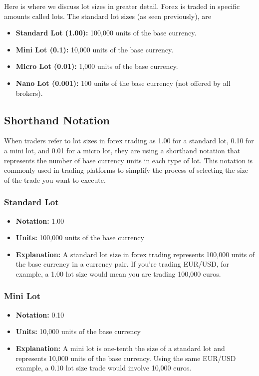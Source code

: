 \documentclass{report}
\begin{document}
     \pagebreak 
     \bigbreak \noindent 
     Here is where we discuss lot sizes in greater detail.
     \bigbreak \noindent 
     Forex is traded in specific amounts called lots. The standard lot sizes (as seen previously), are
     \begin{itemize}
         \item \textbf{Standard Lot (1.00):} 100,000 units of the base currency.
         \item \textbf{Mini Lot (0.1):} 10,000 units of the base currency.
         \item \textbf{Micro Lot (0.01):} 1,000 units of the base currency.
         \item \textbf{Nano Lot (0.001):} 100 units of the base currency (not offered by all brokers).
     \end{itemize}
     \bigbreak \noindent 
     \subsection{Shorthand Notation}
     \bigbreak \noindent 
     When traders refer to lot sizes in forex trading as 1.00 for a standard lot, 0.10 for a mini lot, and 0.01 for a micro lot, they are using a shorthand notation that represents the number of base currency units in each type of lot. This notation is commonly used in trading platforms to simplify the process of selecting the size of the trade you want to execute. 
     \bigbreak \noindent 
     \subsubsection{Standard Lot}
     \begin{itemize}
         \item \textbf{Notation:} 1.00
         \item \textbf{Units:} 100,000 units of the base currency
         \item \textbf{Explanation:} A standard lot size in forex trading represents 100,000 units of the base currency in a currency pair. If you're trading EUR/USD, for example, a 1.00 lot size would mean you are trading 100,000 euros.
     \end{itemize}
     \bigbreak \noindent 
     \subsubsection{Mini Lot}
     \bigbreak \noindent 
     \begin{itemize}
         \item \textbf{Notation:} 0.10
         \item \textbf{Units:} 10,000 units of the base currency
         \item \textbf{Explanation:} A mini lot is one-tenth the size of a standard lot and represents 10,000 units of the base currency. Using the same EUR/USD example, a 0.10 lot size trade would involve 10,000 euros.
     \end{itemize}
     \bigbreak \noindent 
\end{document}
